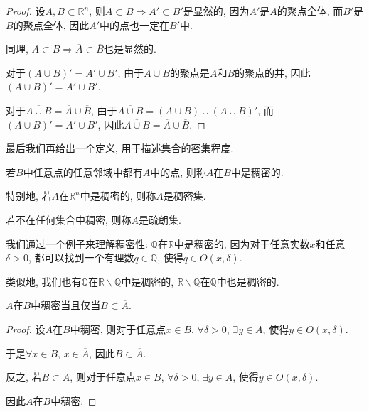 \documentclass[theorem=false,mathfont=none,openany,sub3section]{easybook}
\begin{document}
\begin{proof}
  设$A,B\subset \mathbb{R}^n$, 则$A\subset B \Rightarrow A'\subset B'$是显然的, 因为$A'$是$A$的聚点全体, 而$B'$是$B$的聚点全体, 因此$A'$中的点也一定在$B'$中.\par
  同理, $A\subset B \Rightarrow \overline{A}\subset \overline{B}$也是显然的.\par
  对于$\left(A\cup B\right)'=A'\cup B'$, 由于$A\cup B$的聚点是$A$和$B$的聚点的并, 因此$\left(A\cup B\right)'=A'\cup B'$.\par
  对于$\overline{A\cup B}=\overline{A}\cup \overline{B}$, 由于$\overline{A\cup B}= (A\cup B)\cup (A\cup B)'$, 而$(A\cup B)'= A'\cup B'$, 因此$\overline{A\cup B}=\overline{A}\cup \overline{B}$.\par
\end{proof}

最后我们再给出一个定义, 用于描述集合的密集程度.\par

\begin{definition}
  若$B$中任意点的任意邻域中都有$A$中的点, 则称$A$在$B$中是稠密的.\par
  特别地, 若$A$在$\mathbb{R}^n$中是稠密的, 则称$A$是稠密集.\par
  若不在任何集合中稠密, 则称$A$是疏朗集.\par
\end{definition}

\begin{remark}
  我们通过一个例子来理解稠密性: $\mathbb{Q}$在$\mathbb{R}$中是稠密的, 因为对于任意实数$x$和任意$\delta >0$, 都可以找到一个有理数$q\in \mathbb{Q}$, 使得$q\in O(x,\delta)$.\par
  类似地, 我们也有$\mathbb{Q}$在$\mathbb{R}\backslash \mathbb{Q}$中是稠密的, $\mathbb{R}\backslash \mathbb{Q}$在$\mathbb{Q}$中也是稠密的.\par
\end{remark}

\begin{theorem}
  $A$在$B$中稠密当且仅当$B\subset \overline{A}$.\par
\end{theorem}

\begin{proof}
  设$A$在$B$中稠密, 则对于任意点$x\in B$, $\forall \delta >0$, $\exists y\in A$, 使得$y\in O(x,\delta)$.\par
  于是$\forall x\in B$, $x\in \overline{A}$, 因此$B\subset \overline{A}$.\par
  反之, 若$B\subset \overline{A}$, 则对于任意点$x\in B$, $\forall \delta >0$, $\exists y\in A$, 使得$y\in O(x,\delta)$.\par
  因此$A$在$B$中稠密.\par
\end{proof}
\end{document}

